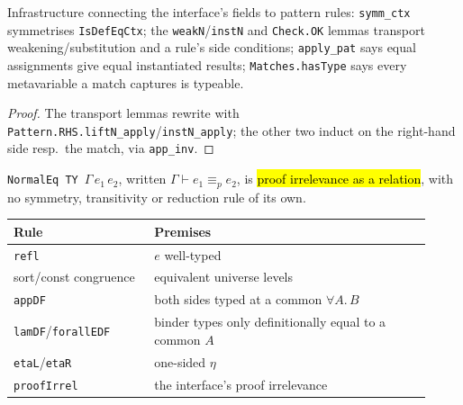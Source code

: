 \begin{lemma}
\label{family:expb-normaleq-pattern-aux}
\leanok
{}

 Infrastructure connecting the interface's fields to pattern rules:
\texttt{symm\_ctx} symmetrises \texttt{IsDefEqCtx}; the \texttt{weakN}/\texttt{instN} and
\texttt{Check.OK} lemmas transport weakening/substitution and a rule's side conditions;
\texttt{apply\_pat} says equal assignments give equal instantiated results; \texttt{Matches.hasType}
says every metavariable a match captures is typeable.
\end{lemma}
\begin{proof}
\leanok
{} The transport lemmas rewrite with \texttt{Pattern.RHS.liftN\_apply}/\texttt{instN\_apply};
the other two induct on the right-hand side resp.\ the match, via \texttt{app\_inv}.
\end{proof}

\begin{definition}
\label{inductive:expb-normaleq}
\leanok
{}

 \texttt{NormalEq TY}~$\Gamma\,e_1\,e_2$, written $\Gamma\vdash e_1\equiv_p e_2$, is
\hl{proof irrelevance as a relation}, with no symmetry, transitivity or reduction rule of its own.
\par\smallskip\noindent
\begin{tabular}{p{0.31\linewidth}p{0.61\linewidth}}
\toprule
Rule & Premises \\
\midrule
\texttt{refl} & $e$ well-typed \\
sort/const congruence & equivalent universe levels \\
\texttt{appDF} & both sides typed at a common $\forall A.\,B$ \\
\texttt{lamDF}/\texttt{forallEDF} & binder types only definitionally equal to a common $A$ \\
\texttt{etaL}/\texttt{etaR} & one-sided $\eta$ \\
\texttt{proofIrrel} & the interface's proof irrelevance \\
\bottomrule
\end{tabular}\par\smallskip
\end{definition}

